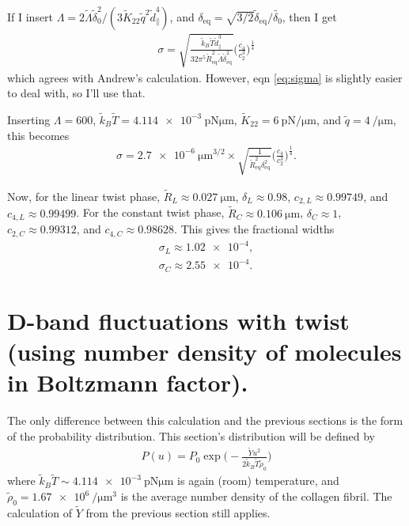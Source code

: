 \documentclass[12pt]{article}
\begin{document}
If I insert $\Lambda=2\tilde{\Lambda}\tilde{\delta}_0^2/(3\tilde{K}_{22}\tilde{q}^2\tilde{d}_{\parallel}^4)$, and $\delta_{\mathrm{eq}}=\sqrt{3/2}\tilde{\delta}_{\mathrm{eq}}/\tilde{\delta_0}$, then I get
\begin{align}
\sigma=\sqrt{\frac{\tilde{k}_B\tilde{T}\tilde{d}_{\parallel}^3}{32\pi^5\tilde{R}_{\mathrm{eq}}^2\tilde{\Lambda}\tilde{\delta}_{\mathrm{eq}}^2}}\bigg(\frac{c_4}{c_2^3}\bigg)^{\frac{1}{4}}
\end{align}
which agrees with Andrew's calculation. However, eqn \ref{eq:sigma} is slightly easier to deal with, so I'll use that.

Inserting $\Lambda=600$, $\tilde{k}_B\tilde{T}=\SI{4.114e-3}{\pico\newton\micro\meter}$, $\tilde{K}_{22}=\SI{6}{\pico\newton\per\micro\meter}$, and $\tilde{q}=\SI{4}{\per\micro\meter}$, this becomes
\begin{align}
\sigma=\SI{2.7e-6}{\micro\meter^{3/2}}\times\sqrt{\frac{1}{\tilde{R}_{\mathrm{eq}}^2\delta_{\mathrm{eq}}^2}}\bigg(\frac{c_4}{c_2^3}\bigg)^{\frac{1}{4}}.
\end{align}

Now, for the linear twist phase, $\tilde{R}_L\approx\SI{0.027}{\micro\meter}$, $\delta_L\approx0.98$, $c_{2,L}\approx0.99749$, and $c_{4,L}\approx0.99499$. For the constant twist phase, $\tilde{R}_C\approx\SI{0.106}{\micro\meter}$, $\delta_C\approx1$, $c_{2,C}\approx0.99312$, and $c_{4,C}\approx0.98628$. This gives the fractional widths
\begin{align}
\sigma_L\approx\num{1.02e-4},\nonumber\\
\sigma_C\approx\num{2.55e-4}.
\end{align}


\section{D-band fluctuations with twist (using number density of molecules in Boltzmann factor).}
The only difference between this calculation and the previous sections is the form of the probability distribution. This section's distribution will be defined by
\begin{align}
P(u)=P_0\exp\bigg(-\frac{\tilde{Y}u^2}{2\tilde{k}_B\tilde{T}\tilde{\rho}_0}\bigg)
\end{align}
where $\tilde{k}_B\tilde{T}\sim\SI{4.114e-3}{\pico\newton\micro\meter}$ is again (room) temperature, and $\tilde{\rho}_0=\SI{1.67e6}{\per\micro\meter\cubed}$ is the average number density of the collagen fibril. The calculation of $\tilde{Y}$ from the previous section still applies.
\end{document}

